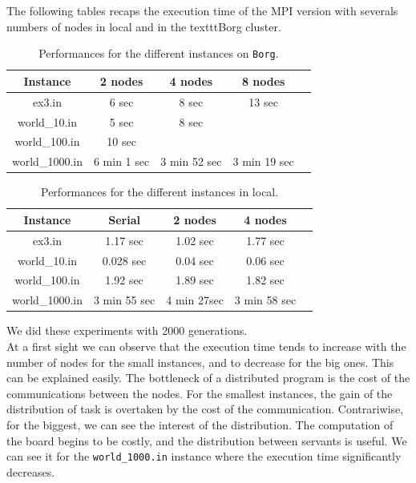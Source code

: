 \documentclass[a4paper,10pt]{article}
\begin{document}
The following tables recaps the execution time of the MPI version with severals numbers of nodes in local and in the texttt{Borg} cluster.
\begin{table}[!ht]
\centering
\begin{tabular}{|c||c|c|c|c|}
  \hline
    Instance     &  2 nodes   & 4 nodes  & 8 nodes  \\
  \hline
    ex3.in       &    6 sec       & 8 sec       &  13 sec \\ 
  \hline
    world\_10.in &    5 sec      & 8 sec      &  \\ 
  \hline
   world\_100.in &    10 sec     &      &  \\ 
  \hline
  world\_1000.in &     6 min 1 sec   & 3 min 52 sec      & 3 min 19 sec  \\ 
  \hline
\end{tabular}
\caption{Performances for the different instances on \texttt{Borg}.}
\end{table}

\begin{table}[!ht]
\centering
\begin{tabular}{|c||c|c|c|c|}
  \hline
    Instance     & Serial   & 2 nodes   & 4 nodes   \\
  \hline
    ex3.in       &    1.17 sec   &  1.02 sec  & 1.77 sec  \\ 
  \hline
    world\_10.in &    0.028 sec   &  0.04 sec      & 0.06 sec   \\ 
  \hline
   world\_100.in &    1.92 sec   &   1.89 sec     &  1.82 sec   \\ 
  \hline
  world\_1000.in &    3 min 55 sec  &    4 min 27sec   & 3 min 58 sec   \\ 
  \hline
\end{tabular}
\caption{Performances for the different instances in local.}
\end{table}


We did these experiments with 2000 generations.
\\

At a first sight we can observe that the execution time tends to increase with the number of nodes for the small instances, and
to decrease for the big ones. This can be explained easily. The bottleneck of a distributed program is the cost of the communications
between the nodes. For the smallest instances, the gain of the distribution of task is overtaken by the cost of the communication.
Contrariwise, for the biggest, we can see the interest of the distribution. The computation of the board begins to be costly, and
the distribution between servants is useful. We can see it for the \texttt{world\_1000.in} instance where the execution time
significantly decreases.
	
\end{document}
